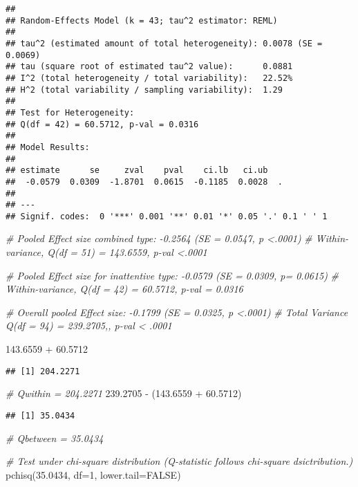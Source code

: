 \documentclass[
]{book}
\newenvironment{Shaded}{\begin{snugshade}}{\end{snugshade}}
\newcommand{\AttributeTok}[1]{\textcolor[rgb]{0.77,0.63,0.00}{#1}}
\newcommand{\CommentTok}[1]{\textcolor[rgb]{0.56,0.35,0.01}{\textit{#1}}}
\newcommand{\ConstantTok}[1]{\textcolor[rgb]{0.00,0.00,0.00}{#1}}
\newcommand{\DecValTok}[1]{\textcolor[rgb]{0.00,0.00,0.81}{#1}}
\newcommand{\FloatTok}[1]{\textcolor[rgb]{0.00,0.00,0.81}{#1}}
\newcommand{\FunctionTok}[1]{\textcolor[rgb]{0.00,0.00,0.00}{#1}}
\newcommand{\NormalTok}[1]{#1}
\newcommand{\SpecialCharTok}[1]{\textcolor[rgb]{0.00,0.00,0.00}{#1}}
\begin{document}
\begin{verbatim}
## 
## Random-Effects Model (k = 43; tau^2 estimator: REML)
## 
## tau^2 (estimated amount of total heterogeneity): 0.0078 (SE = 0.0069)
## tau (square root of estimated tau^2 value):      0.0881
## I^2 (total heterogeneity / total variability):   22.52%
## H^2 (total variability / sampling variability):  1.29
## 
## Test for Heterogeneity:
## Q(df = 42) = 60.5712, p-val = 0.0316
## 
## Model Results:
## 
## estimate      se     zval    pval    ci.lb   ci.ub    
##  -0.0579  0.0309  -1.8701  0.0615  -0.1185  0.0028  . 
## 
## ---
## Signif. codes:  0 '***' 0.001 '**' 0.01 '*' 0.05 '.' 0.1 ' ' 1
\end{verbatim}

\begin{Shaded}
\begin{Highlighting}[]
\CommentTok{\# Pooled Effect size combined type:  {-}0.2564 (SE = 0.0547, p \textless{}.0001)}
\CommentTok{\# Within{-}variance, Q(df = 51) = 143.6559, p{-}val \textless{}.0001}

\CommentTok{\# Pooled Effect size for inattentive type: {-}0.0579 (SE = 0.0309, p= 0.0615)}
\CommentTok{\# Within{-}variance, Q(df = 42) = 60.5712, p{-}val = 0.0316}

\CommentTok{\# Overall pooled Effect size: {-}0.1799 (SE = 0.0325, p \textless{}.0001)}
\CommentTok{\# Total Variance Q(df = 94) = 239.2705,, p{-}val \textless{} .0001}



\FloatTok{143.6559} \SpecialCharTok{+} \FloatTok{60.5712}
\end{Highlighting}
\end{Shaded}

\begin{verbatim}
## [1] 204.2271
\end{verbatim}

\begin{Shaded}
\begin{Highlighting}[]
\CommentTok{\# Qwithin = 204.2271}
\FloatTok{239.2705} \SpecialCharTok{{-}}\NormalTok{ (}\FloatTok{143.6559} \SpecialCharTok{+} \FloatTok{60.5712}\NormalTok{)}
\end{Highlighting}
\end{Shaded}

\begin{verbatim}
## [1] 35.0434
\end{verbatim}

\begin{Shaded}
\begin{Highlighting}[]
\CommentTok{\# Qbetween = 35.0434}



\CommentTok{\# Test under chi{-}square distribution (Q{-}statistic follows chi{-}square dsictribution.)}
\FunctionTok{pchisq}\NormalTok{(}\FloatTok{35.0434}\NormalTok{, }\AttributeTok{df=}\DecValTok{1}\NormalTok{, }\AttributeTok{lower.tail=}\ConstantTok{FALSE}\NormalTok{)}
\end{Highlighting}
\end{Shaded}
\end{document}
